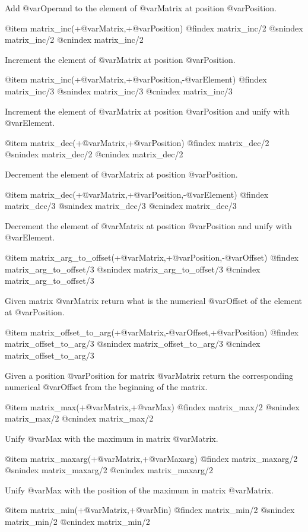 Add @var{Operand} to the element of @var{Matrix} at position
@var{Position}.

@item matrix_inc(+@var{Matrix},+@var{Position})
@findex matrix_inc/2
@snindex matrix_inc/2
@cnindex matrix_inc/2

Increment the element of @var{Matrix} at position @var{Position}.

@item matrix_inc(+@var{Matrix},+@var{Position},-@var{Element})
@findex matrix_inc/3
@snindex matrix_inc/3
@cnindex matrix_inc/3

Increment the element of @var{Matrix} at position @var{Position} and
unify with @var{Element}.

@item matrix_dec(+@var{Matrix},+@var{Position})
@findex matrix_dec/2
@snindex matrix_dec/2
@cnindex matrix_dec/2

Decrement the element of @var{Matrix} at position @var{Position}.

@item matrix_dec(+@var{Matrix},+@var{Position},-@var{Element})
@findex matrix_dec/3
@snindex matrix_dec/3
@cnindex matrix_dec/3

Decrement the element of @var{Matrix} at position @var{Position} and
unify with @var{Element}.

@item matrix_arg_to_offset(+@var{Matrix},+@var{Position},-@var{Offset})
@findex matrix_arg_to_offset/3
@snindex matrix_arg_to_offset/3
@cnindex matrix_arg_to_offset/3

Given matrix @var{Matrix} return what is the numerical @var{Offset} of
the element at @var{Position}.

@item matrix_offset_to_arg(+@var{Matrix},-@var{Offset},+@var{Position})
@findex matrix_offset_to_arg/3
@snindex matrix_offset_to_arg/3
@cnindex matrix_offset_to_arg/3

Given a position @var{Position } for matrix @var{Matrix} return the
corresponding numerical @var{Offset} from the beginning of the matrix.

@item matrix_max(+@var{Matrix},+@var{Max})
@findex matrix_max/2
@snindex matrix_max/2
@cnindex matrix_max/2

Unify @var{Max} with the maximum in matrix  @var{Matrix}.

@item matrix_maxarg(+@var{Matrix},+@var{Maxarg})
@findex matrix_maxarg/2
@snindex matrix_maxarg/2
@cnindex matrix_maxarg/2

Unify @var{Max} with the position of the maximum in matrix  @var{Matrix}.

@item matrix_min(+@var{Matrix},+@var{Min})
@findex matrix_min/2
@snindex matrix_min/2
@cnindex matrix_min/2

